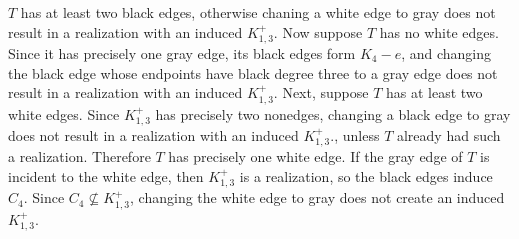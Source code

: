 \documentclass[12pt]{amsart}
\theoremstyle{plain}
\theoremstyle{definition}
\theoremstyle{remark}
\newcommand{\paw}{\ensuremath{K_{1,3}^+}\xspace}
\begin{document}
$T$ has at least two black edges, otherwise chaning a white edge to gray does not result in a realization with an induced \paw.  Now suppose $T$ has no white edges. Since it has precisely one gray edge, its black edges form $K_4-e$, and changing the black edge whose endpoints have black degree three to a gray edge does not result in a realization with an induced \paw.
Next, suppose $T$ has at least two white edges. Since \paw has precisely two nonedges, changing a black edge to gray does not result in a realization with an induced \paw., unless $T$ already had such a realization.  Therefore $T$ has precisely one white edge. If the gray edge of $T$ is incident to the white edge, then \paw is a realization, so the black edges induce $C_4$. Since $C_4 \not\subseteq \paw$, changing the white edge to gray does not create an induced \paw.
\end{document}
